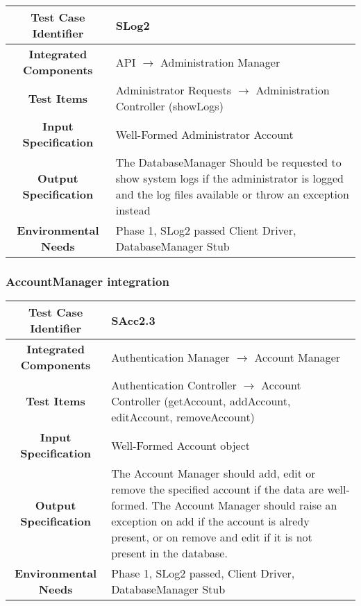 \documentclass[11pt, a4paper,titlepage]{article}
\begin{document}
		  
		  \begin{tabularx}{\textwidth}{| c|X|}
		  	\hline \textbf{Test Case Identifier} & SLog2 \\
		  	\hline \textbf{Integrated Components} &  API $\rightarrow $ Administration Manager \\
		  	\hline \textbf{Test Items} &  Administrator Requests  $\rightarrow $ Administration Controller (showLogs)\\
		  	\hline \textbf{Input Specification} &  Well-Formed Administrator Account\\
		  	\hline \textbf{Output Specification} & The DatabaseManager Should be requested to show system logs if the administrator is logged and the log files available or throw an exception instead\\
		  	\hline \textbf{Environmental Needs} &  Phase 1, SLog2 passed \newline 
		  	Client Driver, DatabaseManager Stub\\
		  	\hline
		  \end{tabularx}
		  \newline
		 
		\subsubsection{AccountManager integration}
		 \begin{tabularx}{\textwidth}{| c|X|}
		 	\hline \textbf{Test Case Identifier} & SAcc2.3 \\
		 	\hline \textbf{Integrated Components} &  Authentication Manager $\rightarrow $ Account Manager \\
		 	\hline \textbf{Test Items} &  Authentication Controller  $\rightarrow $ Account Controller (getAccount, addAccount, editAccount, removeAccount)\\
		 	\hline \textbf{Input Specification} &  Well-Formed Account object\\
		 	\hline \textbf{Output Specification} & The Account Manager should add, edit or remove the specified account if the data are well-formed. \newline The Account Manager should raise an exception on add if the account is alredy present, or on remove and edit if it is not present in the database.\\
		 	\hline \textbf{Environmental Needs} &  Phase 1, SLog2 passed, \newline 
		 	Client Driver, DatabaseManager Stub\\
		 	\hline
		 \end{tabularx}
		 \newline
		 
\end{document}
